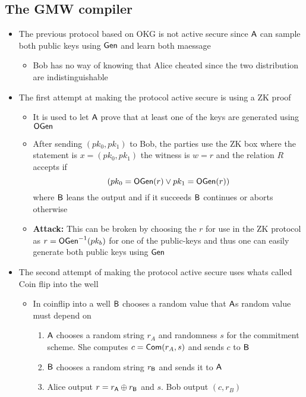 \subsection{The GMW compiler}%
\begin{itemize}
    \item The previous protocol based on OKG is not active secure since $\mathsf{A}$ can sample both public keys using $\mathsf{Gen}$ and learn both maessage
    \begin{itemize}
        \item Bob has no way of knowing that Alice cheated since the two distribution are indistinguishable
    \end{itemize}
    \item The first attempt at making the protocol active secure is using a ZK proof
    \begin{itemize}
        \item It is used to let $\mathsf{A}$ prove that at least one of the keys are generated using $\mathsf{OGen}$ 
        \item After sending $(pk_0, pk_1)$ to Bob, the parties use the ZK box where the statement is $x = (pk_0, pk_1)$ the witness is $w = r$ and the relation $R$ accepts if 
        \begin{equation*}
            (pk_0 = \mathsf{OGen}(r) \lor pk_1 = \mathsf{OGen}(r))
        \end{equation*}
        where $\mathsf{B}$ leans the output and if it succeeds $\mathsf{B}$ continues or aborts otherwise
        \item \textbf{Attack:} This can be broken by choosing the $r$ for use in the ZK protocol as $r = \mathsf{OGen}^{-1}(pk_b)$ for one of the public-keys and thus one can easily generate both public keys using $\mathsf{Gen}$
    \end{itemize}
    \item The second attempt of making the protocol active secure uses whats called Coin flip into the well 
    \begin{itemize}
        \item In coinflip into a well $\mathsf{B}$ chooses a random value that $\mathsf{A}$s random value must depend on
        \begin{enumerate}
            \item $\mathsf{A}$ chooses a random string $r_A$ and randomness $s$ for the commitment scheme. She computes $c = \mathsf{Com}(r_A, s)$ and sends $c$ to $\mathsf{B}$
            \item $\mathsf{B}$ chooses a random string $r_{\mathsf{B}}$ and sends it to $\mathsf{A}$
            \item Alice output $r = r_{\mathsf{A}} \oplus r_{\mathsf{B}}$ and $s$. Bob output $(c, r_B)$

\end{enumerate}
\end{itemize}
\end{itemize}

